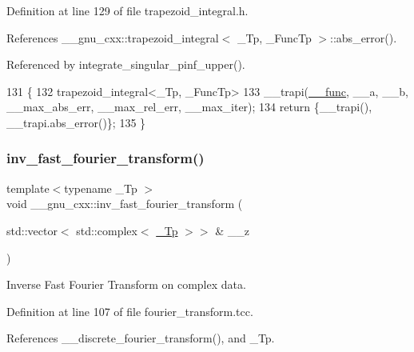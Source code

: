 Definition at line 129 of file trapezoid\+\_\+integral.\+h.



References \+\_\+\+\_\+gnu\+\_\+cxx\+::trapezoid\+\_\+integral$<$ \+\_\+\+Tp, \+\_\+\+Func\+Tp $>$\+::abs\+\_\+error().



Referenced by integrate\+\_\+singular\+\_\+pinf\+\_\+upper().


\begin{DoxyCode}
131     \{
132       trapezoid\_integral<\_Tp, \_FuncTp>
133         \_\_trapi(\hyperlink{namespace____gnu__cxx_af2b2f0c7a2ae72b922b1afefae5a65b2}{\_\_func}, \_\_a, \_\_b, \_\_max\_abs\_err, \_\_max\_rel\_err, \_\_max\_iter);
134       \textcolor{keywordflow}{return} \{\_\_trapi(), \_\_trapi.abs\_error()\};
135     \}
\end{DoxyCode}
\mbox{\label{namespace____gnu__cxx_a96b56c927599a614656027d3ab4b82ac}} 
\subsubsection{\texorpdfstring{inv\+\_\+fast\+\_\+fourier\+\_\+transform()}{inv\_fast\_fourier\_transform()}\hspace{0.1cm}{\footnotesize\ttfamily [1/3]}}
{\footnotesize\ttfamily template$<$typename \+\_\+\+Tp $>$ \\
void \+\_\+\+\_\+gnu\+\_\+cxx\+::inv\+\_\+fast\+\_\+fourier\+\_\+transform (\begin{DoxyParamCaption}\item[{std\+::vector$<$ std\+::complex$<$ \hyperlink{namespace____gnu__cxx_a3b19a9c800ca194374ef9172290f7d79}{\+\_\+\+Tp} $>$$>$ \&}]{\+\_\+\+\_\+z }\end{DoxyParamCaption})}

Inverse Fast Fourier Transform on complex data. 

Definition at line 107 of file fourier\+\_\+transform.\+tcc.



References \+\_\+\+\_\+discrete\+\_\+fourier\+\_\+transform(), and \+\_\+\+Tp.




